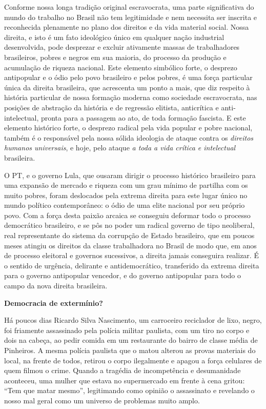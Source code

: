 Conforme nossa longa tradição original escravocrata, uma parte
significativa do mundo do trabalho no Brasil não tem legitimidade e nem
necessita ser inscrita e reconhecida plenamente no plano dos direitos e
da vida material social. Nossa direita, e isto é um fato ideológico
único em qualquer nação industrial desenvolvida, pode desprezar e
excluir ativamente massas de trabalhadores brasileiros, pobres e negros
em sua maioria, do processo da produção e acumulação de riqueza
nacional. Este elemento simbólico forte, o desprezo antipopular e o ódio
pelo povo brasileiro e pelos pobres, é uma força particular única da
direita brasileira, que acrescenta um ponto a mais, que diz respeito à
história particular de nossa formação moderna como sociedade
escravocrata, nas posições de abstração da história e de regressão
elitista, anticrítica e anti-intelectual, pronta para a passagem ao ato,
de toda formação fascista. E este elemento histórico forte, o desprezo
radical pela vida popular e pobre nacional, também é o responsável pela
nossa sólida ideologia de ataque contra os \emph{direitos humanos
universais}, e hoje, pelo ataque \emph{a toda a vida crítica e
intelectual} brasileira.

O PT, e o governo Lula, que ousaram dirigir o processo histórico
brasileiro para uma expansão de mercado e riqueza com um grau mínimo de
partilha com os muito pobres, foram deslocados pela extrema direita para
este lugar único no mundo político contemporâneo: o ódio de uma elite
nacional por seu próprio povo. Com a força desta paixão arcaica se
conseguiu deformar todo o processo democrático brasileiro, e se pôs no
poder um radical governo de tipo neoliberal, real representante do
sistema da corrupção de Estado brasileiro, que em poucos meses atingiu
os direitos da classe trabalhadora no Brasil de modo que, em anos de
processo eleitoral e governos sucessivos, a direita jamais conseguira
realizar. É o sentido de urgência, delirante e antidemocrático,
transferido da extrema direita para o governo antipopular vencedor, e do
governo antipopular para todo o campo da nova direita brasileira.

\textbf{Democracia de extermínio?}

Há poucos dias Ricardo Silva Nascimento, um carroceiro reciclador de
lixo, negro, foi friamente assassinado pela polícia militar paulista,
com um tiro no corpo e dois na cabeça, ao pedir comida em um restaurante
do bairro de classe média de Pinheiros. A mesma polícia paulista que o
matou alterou as provas materiais do local, na frente de todos, retirou
o corpo ilegalmente e apagou a força celulares de quem filmou o crime.
Quando a tragédia de incompetência e desumanidade aconteceu, uma mulher
que estava no supermercado em frente à cena gritou: ``Tem que matar
mesmo'', legitimando como opinião o assassinato e revelando o nosso mal
geral como um universo de problemas muito amplo.

